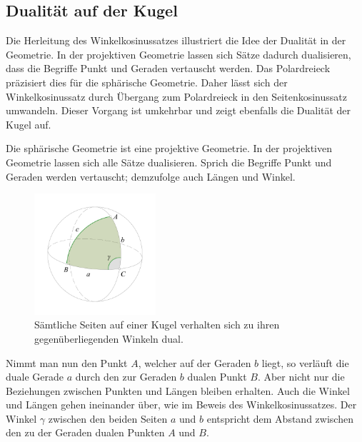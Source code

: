 \begin{refsection}
\section{Dualität auf der Kugel}
Die Herleitung des Winkelkosinussatzes illustriert die Idee der
Dualität in der Geometrie. In der projektiven Geometrie lassen sich
Sätze dadurch dualisieren, dass die Begriffe Punkt und Geraden
vertauscht werden. Das Polardreieck präzisiert dies für die sphärische
Geometrie.
%
Daher lässt sich der Winkelkosinussatz durch Übergang zum Polardreieck
in den Seitenkosinussatz umwandeln. Dieser Vorgang ist umkehrbar
und zeigt ebenfalls die Dualität der Kugel auf.

\begin{satz}
Die sphärische Geometrie ist eine projektive Geometrie. In der
projektiven Geometrie lassen sich alle Sätze dualisieren. Sprich
die Begriffe Punkt und Geraden werden vertauscht; demzufolge auch
Längen und Winkel.
\label{skript:kugel:satz:Dualitaet}
\end{satz}
%

\begin{figure}
\centering
\includegraphics[width=0.4\textwidth]{kugel/Dualitaet.jpg}
\caption{Sämtliche Seiten auf einer Kugel verhalten sich zu ihren
gegenüberliegenden Winkeln dual.}
\end{figure}%

Nimmt man nun den Punkt $A$, welcher auf der Geraden $b$ liegt, so
verläuft die duale Gerade $a$ durch den zur Geraden $b$ dualen Punkt
$B$.
Aber nicht nur die Beziehungen zwischen Punkten und Längen bleiben
erhalten. Auch die Winkel und Längen gehen ineinander über, wie im
Beweis des Winkelkosinussatzes.
Der Winkel $\gamma$ zwischen den beiden Seiten $a$ und $b$ entspricht
dem Abstand zwischen den zu der Geraden dualen Punkten $A$ und $B$.


\end{refsection}
